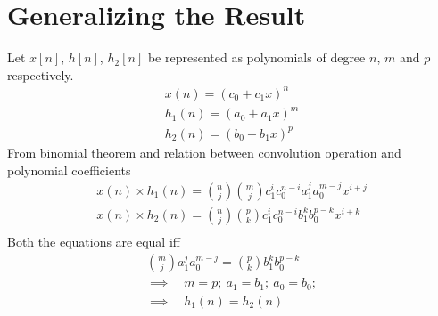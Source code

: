 \documentclass[journal,12pt,twocolumn]{IEEEtran}
\begin{document}
\section{Generalizing the Result}
	Let $x[n]$, $h[n]$, $h_2[n]$ be represented as polynomials of degree $n$, $m$ and $p$ respectively.
	\begin{align}
		x(n)=(c_0 + c_1x)^n \\
		h_1(n)=(a_0 + a_1x)^m \\
		h_2(n)=(b_0 + b_1x)^p
	\end{align}
	From binomial theorem and relation between convolution operation and polynomial coefficients
	\begin{align}
		x(n) \times h_1(n) = \binom{n}{j} \binom{m}{j}c_1^ic_0^{n-i}a_1^{j}a_0^{m-j}x^{i+j} \\
	        x(n) \times h_2(n) = \binom{n}{j} \binom{p}{k}c_1^ic_0^{n-i}b_1^{k}b_0^{p-k}x^{i+k} \\
	\end{align}
	Both the equations are equal iff
	\begin{align}
		\binom{m}{j}a_1^{j}a_0^{m-j}=\binom{p}{k}b_1^{k}b_0^{p-k} \\
		\implies \quad m=p ; \ a_1 = b_1 ; \ a_0 = b_0 ; \\
		\implies \quad h_1(n) = h_2(n)
	\end{align}
\end{document}
